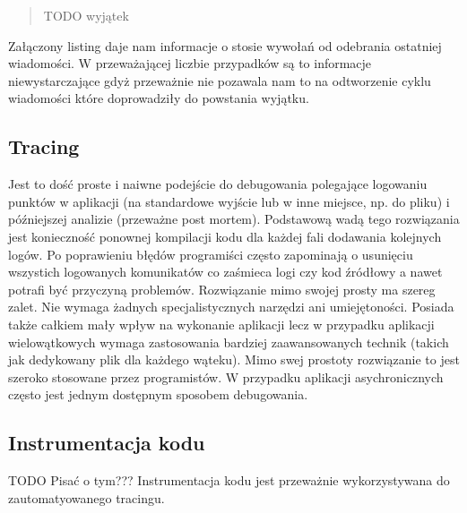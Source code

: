 \begin{quote}
TODO wyjątek
\end{quote}

Załączony listing daje nam informacje o stosie wywołań od odebrania ostatniej wiadomości. W przeważającej liczbie przypadków są to informacje niewystarczające gdyż przeważnie nie pozawala nam to na odtworzenie cyklu wiadomości które doprowadziły do powstania wyjątku.

\subsection{Tracing}

Jest to dość proste i naiwne podejście do debugowania polegające logowaniu punktów w aplikacji (na standardowe wyjście lub w inne miejsce, np. do pliku) i późniejszej analizie (przeważne post mortem). Podstawową wadą tego rozwiązania jest konieczność ponownej kompilacji kodu dla każdej fali dodawania kolejnych logów. Po poprawieniu błędów programiści często zapominają o usunięciu wszystich logowanych komunikatów co zaśmieca logi czy kod źródłowy a nawet potrafi być przyczyną problemów.
Rozwiązanie mimo swojej prosty ma szereg zalet. Nie wymaga żadnych specjalistycznych narzędzi ani umiejętoności. Posiada także całkiem mały wpływ na wykonanie aplikacji lecz w przypadku aplikacji wielowątkowych wymaga zastosowania bardziej zaawansowanych technik (takich jak dedykowany plik dla każdego wąteku). 
Mimo swej prostoty rozwiązanie to jest szeroko stosowane przez programistów. W przypadku aplikacji asychronicznych często jest jednym dostępnym sposobem debugowania. 

\subsection{Instrumentacja kodu}

TODO Pisać o tym???
Instrumentacja kodu jest przeważnie wykorzystywana do zautomatyowanego tracingu.

